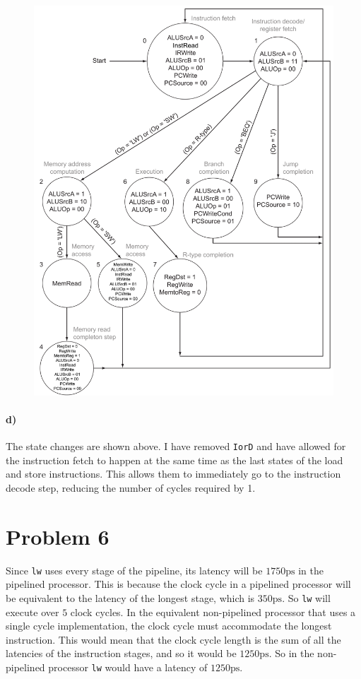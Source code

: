 \documentclass[12pt]{article}
\begin{document}
\begin{figure}[!ht]
    \begin{center}
        \includegraphics[width=4.7in]{problem5d.png}
    \end{center}
\end{figure}

\paragraph{d)}

The state changes are shown above. I have removed \texttt{IorD} and have allowed for the instruction fetch to happen at the same time as the last states
of the load and store instructions. This allows them to immediately go to the instruction decode step, reducing the number of cycles required by 1.

\section*{Problem 6}

Since \texttt{lw} uses every stage of the pipeline, its latency will be \(1750\text{ps}\) in the pipelined processor. This is because the clock cycle
in a pipelined processor will be equivalent to the latency of the longest stage, which is \(350\text{ps}\). So \texttt{lw} will execute over \(5\) clock
cycles. In the equivalent non-pipelined processor that uses a single cycle implementation, the clock cycle must accommodate the longest instruction.
This would mean that the clock cycle length is the sum of all the latencies of the instruction stages, and so it would be \(1250\text{ps}\). So in
the non-pipelined processor \texttt{lw} would have a latency of \(1250\text{ps}\).
\end{document}
